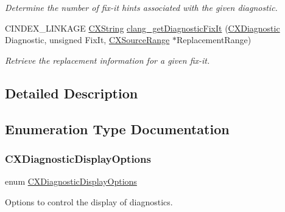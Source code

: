 \begin{DoxyCompactItemize}
\begin{DoxyCompactList}\small\item\em Determine the number of fix-\/it hints associated with the given diagnostic. \end{DoxyCompactList}\item 
C\+I\+N\+D\+E\+X\+\_\+\+L\+I\+N\+K\+A\+GE \mbox{\hyperlink{structCXString}{C\+X\+String}} \mbox{\hyperlink{group__CINDEX__DIAG_gadf990bd68112475c5c07b19c1fe3938a}{clang\+\_\+get\+Diagnostic\+Fix\+It}} (\mbox{\hyperlink{group__CINDEX__DIAG_ga44bb8aba7c40590ad25d1763c4fbff7f}{C\+X\+Diagnostic}} Diagnostic, unsigned Fix\+It, \mbox{\hyperlink{structCXSourceRange}{C\+X\+Source\+Range}} $\ast$Replacement\+Range)
\begin{DoxyCompactList}\small\item\em Retrieve the replacement information for a given fix-\/it. \end{DoxyCompactList}\end{DoxyCompactItemize}


\subsection{Detailed Description}


\subsection{Enumeration Type Documentation}
\mbox{\label{group__CINDEX__DIAG_ga0545c7c3ef36a397c44d142b0385b8d1}} 
\subsubsection{\texorpdfstring{C\+X\+Diagnostic\+Display\+Options}{CXDiagnosticDisplayOptions}}
{\footnotesize\ttfamily enum \mbox{\hyperlink{group__CINDEX__DIAG_ga0545c7c3ef36a397c44d142b0385b8d1}{C\+X\+Diagnostic\+Display\+Options}}}



Options to control the display of diagnostics. 

